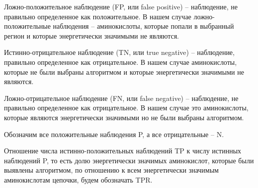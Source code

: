 Ложно-положительное наблюдение (FP, или false positive) -- наблюдение, не правильно
определенное как положительное. В нашем случае ложно-положительные наблюдения -- аминокислоты, которые попали в выбранный регион и которые энергетически значимыми не являются.

Истинно-отрицательное наблюдение (TN, или true negative) -- наблюдение, правильно определенное как отрицательное. В нашем случае аминокислоты, которые не были выбраны алгоритмом и которые энергетически значимыми не являются.

Ложно-отрицательное наблюдение (FN, или false negative) -- наблюдение, не правильно определенное как отрицательное. В нашем случае это аминокислоты, которые являются энергетически значимыми но не были выбраны алгоритмом.

Обозначим все положительные наблюдения P, а  все отрицательные -- N.

Отношение числа истинно-положительных наблюдений TP к числу истинных наблюдений P, то есть долю энергетически значимых аминокислот, которые были выявлены алгоритмом, по отношению к всем энергетически значимым аминокислотам цепочки, будем обозначать TPR. 


